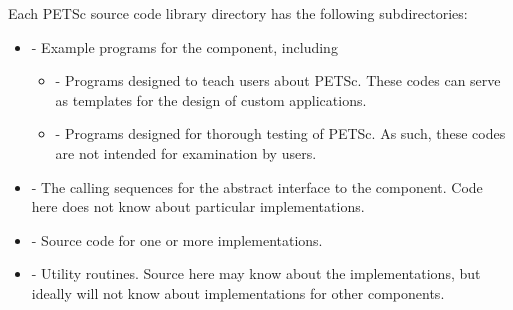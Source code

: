 Each PETSc source code library directory has the following subdirectories:
\begin{itemize}
\item  {} - Example programs for the component, including
  \begin{itemize}
  \item {} - Programs designed to teach users about PETSc.  These
          codes can serve as templates for the design of custom applications.
  \item {} - Programs designed for thorough testing of PETSc.  As such,
          these codes are not intended for examination by users.
  \end{itemize}
\item  {} - The calling sequences for the abstract interface
        to the component.
        Code here does not know about particular implementations.
\item  {} - Source code for one or more implementations.
\item  {} - Utility routines.  Source here may know about the
          implementations, but ideally will not know about implementations
          for other components.
\end{itemize}

%
%


